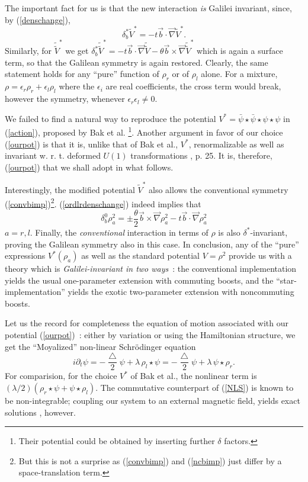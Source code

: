 \documentclass[a4paper,11pt]{article}
\def\p{{\partial}}
\def\vb{{\vec b}}
\def\vnabla{{\vec\nabla}}
\begin{document}
The important fact for us is that the new interaction
{\it is} Galilei invariant, since, by
(\ref{denschange}),
\begin{equation}
     \delta^*_{b}\widetilde{V}^*=-t\vb\cdot\vnabla\widetilde{V}^*.
\end{equation}
Similarly, for $\widetilde{\widetilde{V}}^*$ we get
$\delta^*_{b}\widetilde{\widetilde{V}}^*=-t\vb\cdot\vnabla
\widetilde{\widetilde{V}}
-\theta\vb\times\vnabla\widetilde{\widetilde{V}}^*$
which is again a surface term, so that the Galilean symmetry is
again restored.
Clearly, the same statement holds for any ``pure'' function
of $\rho_{r}$ or of $\rho_{l}$ alone.  For a mixture,
$\rho=\epsilon_{r}\rho_{r}+\epsilon_{l}\rho_{l}$
where the $\epsilon_{i}$ are real coefficients, the cross
term would break, however the symmetry,
whenever $\epsilon_{r}\epsilon_{l}\neq0$.

We failed to find a natural way to reproduce the potential
$V^*=\bar{\psi}\star\bar{\psi}\star{\psi}\star\psi$
in (\ref{action}),
proposed by Bak et al.  \cite{Baketal}\footnote{Their potential
could be obtained by inserting further $\delta$ factors.}.
Another argument in favor of our choice (\ref{ourpot})
is that it is, unlike that of Bak et al., $V^*$, renormalizable
as well as invariant w. r. t. deformed
$U(1)$ transformations \cite{Arefeva}, p. 25.
It is, therefore, (\ref{ourpot}) that we shall adopt in what follows.

Interestingly, the modified potential $\widetilde{V}^*$ also
allows the conventional symmetry (\ref{convbimp})\footnote{
But this is not a surprise as (\ref{convbimp}) and (\ref{ncbimp}) just
differ by a space-translation term.}.
(\ref{ordlrdenschange})  indeed implies that
\begin{equation}
     \delta^0_{b}\rho_{a}^2=
     \pm\frac{\theta}{2}\vb\times\vnabla\rho_{a}^2
     -t\vb\cdot\vnabla\rho_{a}^2
\end{equation}
$a=r,l$. Finally, the {\it conventional} interaction
in terms of  $\rho$ is also $\delta^*$-invariant,
proving the Galilean symmetry also in this case.
In conclusion, any of the ``pure'' expressions
$
V^*(\rho_{a})
$
as well as the standard potential $V=\rho^2$
provide us with a theory which is {\it Galilei-invariant in two ways}~:
the conventional implementation yields the usual one-parameter
extension with commuting boosts, and
the ``star-implementation'' yields the  exotic two-parameter
extension with noncommuting boosts.

Let us the record for completeness the equation of motion
associated with our potential (\ref{ourpot})~: either by variation or
using the Hamiltonian structure, we get the ``Moyalized'' non-linear
Schr\"odinger equation
\begin{equation}
i\p_{t}\psi=-\frac{\bigtriangleup}{2}\psi
+\lambda\,\rho_{l}\star\psi=
-\frac{\bigtriangleup}{2}\psi
+\lambda\,\psi\star\rho_{r}.
\label{NLS}
\end{equation}
For comparision, for the choice $V^*$ of Bak et al.,
the nonlinear term is
$(\lambda/2)(\rho_{r}\star\psi+\psi\star\rho_{l})$.
The commutative counterpart of (\ref{NLS}) is known to be
non-integrable; coupling our system to an external magnetic field,
yields exact solutions \cite{Langmann}, however.
\end{document}

